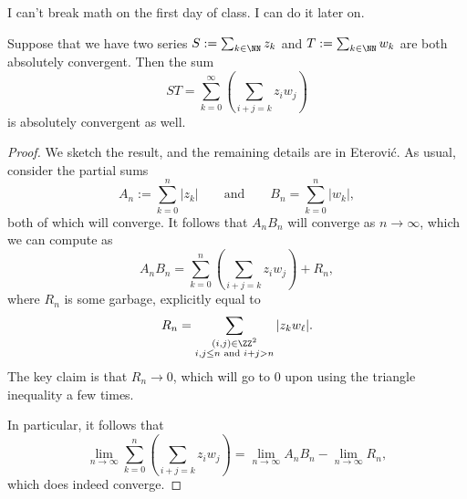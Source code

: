 \begin{quot}
	I can't break math on the first day of class. I can do it later on.
\end{quot}
\begin{lemma}
	Suppose that we have two series $S:=\sum_{k\in\NN}z_k$ and $T:=\sum_{k\in\NN}w_k$ are both absolutely convergent. Then the sum
	\[ST=\sum_{k=0}^\infty\left(\sum_{i+j=k}z_iw_j\right)\]
	is absolutely convergent as well.
\end{lemma}
\begin{proof}
	We sketch the result, and the remaining details are in Eterovi\'c. As usual, consider the partial sums
	\[A_n:=\sum_{k=0}^n|z_k|\qquad\text{and}\qquad B_n=\sum_{k=0}^n|w_k|,\]
	both of which will converge. It follows that $A_nB_n$ will converge as $n\to\infty$, which we can compute as
	\[A_nB_n=\sum_{k=0}^n\left(\sum_{i+j=k}z_iw_j\right)+R_n,\]
	where $R_n$ is some garbage, explicitly equal to
	\[R_n=\sum_{\substack{(i,j)\in\ZZ^2\\i,j\le n\text{ and }i+j>n}}|z_kw_\ell|.\]
	The key claim is that $R_n\to0$, which will go to $0$ upon using the triangle inequality a few times.\todo{}

	In particular, it follows that
	\[\lim_{n\to\infty}\sum_{k=0}^n\left(\sum_{i+j=k}z_iw_j\right)=\lim_{n\to\infty}A_nB_n-\lim_{n\to\infty}R_n,\]
	which does indeed converge.
\end{proof}
